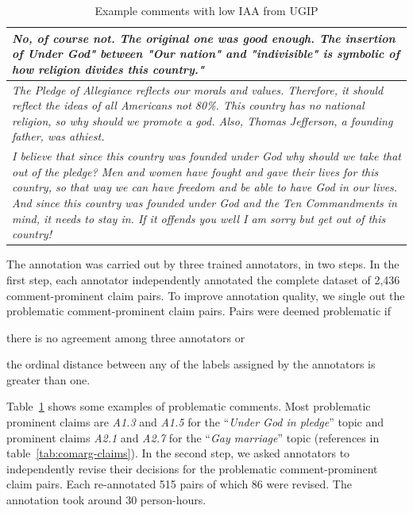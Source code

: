 \begin{table}
\centering
{\small
\begin{tabular}{@{}p{\columnwidth}@{}}
\toprule
\textit{
\normalsize{%
No, of course not. The original one was good enough.  The insertion of Under
God" between "Our nation" and "indivisible" is symbolic of how religion divides
this country."}
}\\
\midrule
\normalsize{%
\textit{
The Pledge of Allegiance reflects our morals and values. Therefore, it should
reflect the ideas of all Americans not 80\%. This country has no national
religion, so why should we promote a god. Also, Thomas Jefferson, a founding
father, was athiest.
}
}
\\
\midrule
\normalsize{%
\textit{
I believe that since this country was founded under God why should we take that
out of the pledge? Men and women have fought and gave their lives for this
country, so that way we can have freedom and be able to have God in our lives.
And since this country was founded under God and the Ten Commandments in mind,
it needs to stay in. If it offends you well I am sorry but get out of this
country!}
}\\
\bottomrule
\end{tabular}
}
\caption{Example comments with low IAA from UGIP}
\label{tab:problematic-comments}
\end{table}

The annotation was carried out by three trained annotators, in two
steps. 
In the first step, each annotator independently annotated the complete dataset
of 2,436 comment-prominent claim pairs. 
To improve annotation quality, we single out the problematic comment-prominent claim
pairs. 
Pairs were deemed problematic if 
\begin{enumerate*}[label=(\arabic*)]
\item there is no agreement among three annotators or
\item the ordinal distance between any of the labels assigned
by the annotators is greater than one. 
\end{enumerate*}
Table~\ref{tab:problematic-comments} shows some examples of problematic comments. 
Most problematic prominent claims are \textit{A1.3} and \textit{A1.5} for the 
``\emph{Under God in pledge}'' topic
and prominent claims \textit{A2.1} and \textit{A2.7} for the ``\emph{Gay marriage}''
topic (references
in table~\ref{tab:comarg-claims}). 
In the second step, we asked annotators to independently revise 
their decisions for the problematic comment-prominent claim pairs. 
Each re-annotated 515 pairs of which 86 were revised. 
The annotation took around 30 person-hours. 

